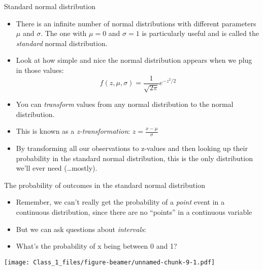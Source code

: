 \begin{frame}{Standard normal distribution}

\begin{itemize}
\itemsep1pt\parskip0pt
\item
  There is an infinite number of normal distributions with different
  parameters \(\mu\) and \(\sigma\). The one with \(\mu = 0\) and
  \(\sigma = 1\) is particularly useful and is called the
  \emph{standard} normal distribution.
\item
  Look at how simple and nice the normal distribution appears when we
  plug in those values: \[
    f(z,\mu,\sigma) = \frac{1}{\sqrt{2 \pi}} e^{-z^2/2}
  \]
\item
  You can \emph{transform} values from any normal distribution to the
  normal distribution.
\item
  This is known as a \emph{z-transformation}:
  \(z = \frac{x - \mu}{\sigma}\)
\item
  By transforming all our observations to z-values and then looking up
  their probability in the standard normal distribution, this is the
  only distribution we'll ever need (\ldots{}mostly).
\end{itemize}

\end{frame}

\begin{frame}{The probability of outcomes in the standard normal
distribution}

\begin{itemize}
\itemsep1pt\parskip0pt
\item
  Remember, we can't really get the probability of a \emph{point} event
  in a continuous distribution, since there are no ``points'' in a
  continuous variable
\item
  But we can ask questions about \emph{intervals}:
\item
  What's the probability of x being between 0 and 1?
\end{itemize}

\texttt{[image: Class\_1\_files/figure-beamer/unnamed-chunk-9-1.pdf]}

\end{frame}

